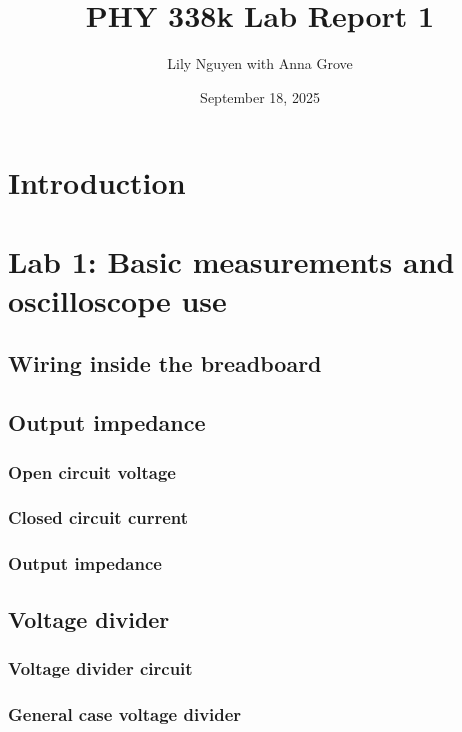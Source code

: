 \documentclass{article}
\title{PHY 338k Lab Report 1}
\author{Lily Nguyen with Anna Grove}
\date{September 18, 2025}
\begin{document}
\maketitle

\section{Introduction}


\section{Lab 1: Basic measurements and oscilloscope use}

\subsection{Wiring inside the breadboard}

\subsection{Output impedance}


\subsubsection{Open circuit voltage}

\subsubsection{Closed circuit current}


\subsubsection{Output impedance}


\subsection{Voltage divider}

\subsubsection{Voltage divider circuit}


\subsubsection{General case voltage divider}
\end{document}

